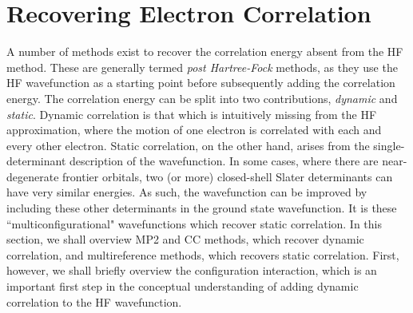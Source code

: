 \section{Recovering Electron Correlation}\label{section: methods_postHF}
A number of methods exist to recover the correlation energy absent from the \ac{HF} method. These are generally termed \textit{post Hartree-Fock} methods, as they use the \ac{HF} wavefunction as a starting point before subsequently adding the correlation energy. The correlation energy can be split into two contributions, \textit{dynamic} and \textit{static}. Dynamic correlation is that which is intuitively missing from the \ac{HF} approximation, where the motion of one electron is correlated with each and every other electron. Static correlation, on the other hand, arises from the single-determinant description of the wavefunction. In some cases, where there are near-degenerate frontier orbitals, two (or more) closed-shell Slater determinants can have very similar energies.\cite{Cramer2002} As such, the wavefunction can be improved by including these other determinants in the ground state wavefunction. It is these ``multiconfigurational" wavefunctions which recover static correlation. In this section, we shall overview \acf{MP2} and \ac{CC} methods, which recover dynamic correlation, and multireference methods, which recovers static correlation. First, however, we shall briefly overview the configuration interaction, which is an important first step in the conceptual understanding of adding dynamic correlation to the \ac{HF} wavefunction. 
